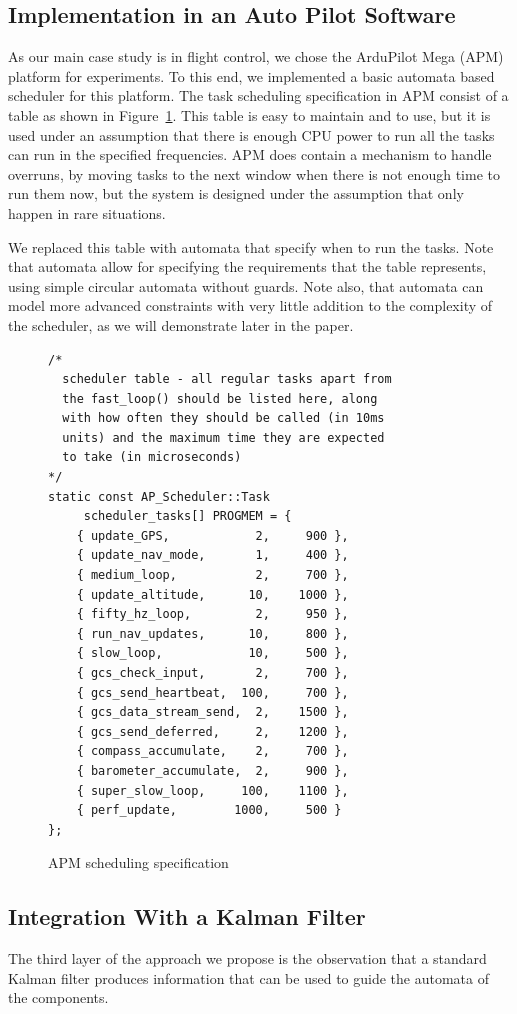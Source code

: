 \documentclass{sig-alternate-ipsn13}
\begin{document}
\subsection{Implementation in an Auto Pilot Software}
As our main case study is in flight control, we chose the ArduPilot Mega
(APM) platform for experiments. To this end, we implemented a basic automata based scheduler for this platform. The task scheduling specification in APM consist of a table as shown in Figure~\ref{fig:apm-scheduler}. This table is easy to maintain and to use, but it is used under an assumption that there is enough CPU power to run all the tasks can run in the specified frequencies. APM does contain a mechanism to handle overruns, by moving tasks to the next window when there is not enough time to run them now, but the system is designed under the assumption that only happen in rare situations.

We replaced this table with automata that specify when to run the tasks. Note that automata allow for specifying the requirements that the table represents, using simple circular automata without guards. Note also, that automata can model more advanced constraints with very little addition to the complexity of the scheduler, as we will demonstrate later in the paper. 

\begin{figure}
	\scriptsize
	\begin{lstlisting}
/*
  scheduler table - all regular tasks apart from
  the fast_loop() should be listed here, along 
  with how often they should be called (in 10ms 
  units) and the maximum time they are expected 
  to take (in microseconds)
*/
static const AP_Scheduler::Task 
     scheduler_tasks[] PROGMEM = {
	{ update_GPS,            2,     900 },
	{ update_nav_mode,       1,     400 },
	{ medium_loop,           2,     700 },
	{ update_altitude,      10,    1000 },
	{ fifty_hz_loop,         2,     950 },
	{ run_nav_updates,      10,     800 },
	{ slow_loop,            10,     500 },
	{ gcs_check_input,       2,     700 },
	{ gcs_send_heartbeat,  100,     700 },
	{ gcs_data_stream_send,  2,    1500 },
	{ gcs_send_deferred,     2,    1200 },
	{ compass_accumulate,    2,     700 },
	{ barometer_accumulate,  2,     900 },
	{ super_slow_loop,     100,    1100 },
	{ perf_update,        1000,     500 }
};
	\end{lstlisting}
	\caption{APM scheduling specification}
	\label{fig:apm-scheduler} 
\end{figure}


\subsection{Integration With a Kalman Filter}
The third layer of the approach we propose is the observation that a standard Kalman filter produces information that can be used to guide the automata of the components. 
\end{document}
